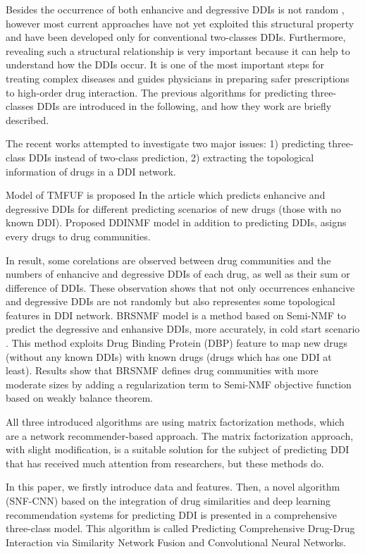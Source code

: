 \documentclass{bmcart}
\begin{document}
Besides the occurrence of both enhancive and degressive DDIs is not random \cite{shi2018tmfuf, yu2018predicting}, however most current approaches have not yet exploited this structural property and have been developed only for conventional two-classes DDIs. Furthermore, revealing such a structural relationship is very important because it can help to understand how the DDIs occur. It is one of the most important steps for treating complex diseases \cite{cokol2017efficient} and guides physicians in preparing safer prescriptions to high-order drug interaction. The previous algorithms for predicting three-classes DDIs are introduced in the following, and how they work are briefly described. 

The recent works attempted to investigate two major issues: 1) predicting three-class DDIs instead of two-class prediction, 2) extracting the topological information of drugs in a DDI network.

Model of TMFUF is proposed In the article \cite{shi2018tmfuf} which predicts enhancive and degressive DDIs for different predicting scenarios of new drugs (those with no known DDI). Proposed DDINMF model \cite{yu2018predicting} in addition to predicting DDIs, asigns every drugs to drug communities.

In result, some corelations are observed between drug communities and the numbers of enhancive and degressive DDIs of each drug, as well as their sum or difference of DDIs. These observation shows that not only occurrences enhancive and degressive DDIs are not randomly but also representes some topological features in DDI network. BRSNMF \cite{shi2019detecting} model is a method based on Semi-NMF to predict the degressive and enhansive DDIs, more accurately, in cold start scenario \cite{camacho2018social}. This method exploits Drug Binding Protein (DBP) feature to map new drugs (without any known DDIs) with known drugs (drugs which has one DDI at least). Results show that BRSNMF defines drug communities with more moderate sizes by adding a regularization term to Semi-NMF objective function based on weakly balance theorem.

All three introduced algorithms are using matrix factorization methods, which are a network recommender-based approach. The matrix factorization approach, with slight modification, is a suitable solution for the subject of predicting DDI that has received much attention from researchers, but these methods do.

In this paper, we firstly introduce data and features. Then, a novel algorithm (SNF-CNN) based on the integration of drug similarities and deep learning recommendation systems for predicting DDI is presented in a comprehensive three-class model. This algorithm is called Predicting Comprehensive Drug-Drug Interaction via Similarity Network Fusion and Convolutional Neural Networks.
\end{document}
